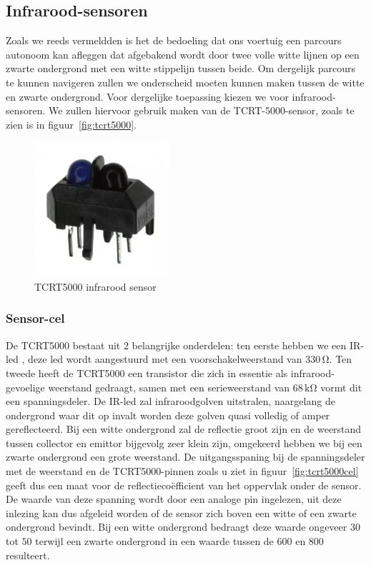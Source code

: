 \subsection{Infrarood-sensoren}
Zoals we reeds vermeldden is het de bedoeling dat ons voertuig een parcours autonoom kan afleggen dat afgebakend wordt door twee volle witte lijnen op een zwarte ondergrond met een witte stippelijn tussen beide. Om dergelijk parcours te kunnen navigeren zullen we onderscheid moeten kunnen maken tussen de witte en zwarte ondergrond. Voor dergelijke toepassing kiezen we voor infrarood-sensoren. We zullen hiervoor gebruik maken van de TCRT-5000-sensor, zoals te zien is in figuur~\vref{fig:tcrt5000}. 

\begin{figure}[H]
	\centering
	\includegraphics[height=5cm]{tcrt5000.png}
	\caption{TCRT5000 infrarood sensor\label{fig:tcrt5000}}
\end{figure}

\subsubsection*{Sensor-cel}
De TCRT5000 bestaat uit 2 belangrijke onderdelen: ten eerste hebben we een IR-led , deze led wordt aangestuurd met een voorschakelweerstand van $330\,\mathrm{\Omega}$. Ten tweede heeft de TCRT5000 een transistor die zich in essentie als infrarood-gevoelige weerstand gedraagt, samen met een serieweerstand van $68\,\mathrm{k\Omega}$ vormt dit een spanningsdeler. De IR-led zal infraroodgolven uitstralen, naargelang de ondergrond waar dit op invalt worden deze golven quasi volledig of amper gereflecteerd. Bij een witte ondergrond zal de reflectie groot zijn en de weerstand tussen collector en emittor bijgevolg zeer klein zijn, omgekeerd hebben we bij een zwarte ondergrond een grote weerstand. De uitgangsspaning bij de spanningsdeler met de weerstand en de TCRT5000-pinnen zoals u ziet in figuur~\vref{fig:tcrt5000cel} geeft dus een maat voor de reflectieco\"efficient van het oppervlak onder de sensor. De waarde van deze spanning wordt door een analoge pin ingelezen, uit deze inlezing kan dus afgeleid worden of de sensor zich boven een witte of een zwarte ondergrond bevindt. Bij een witte ondergrond bedraagt deze waarde ongeveer $30$ tot $50$ terwijl een zwarte ondergrond in een waarde tussen de $600$ en $800$ resulteert.

